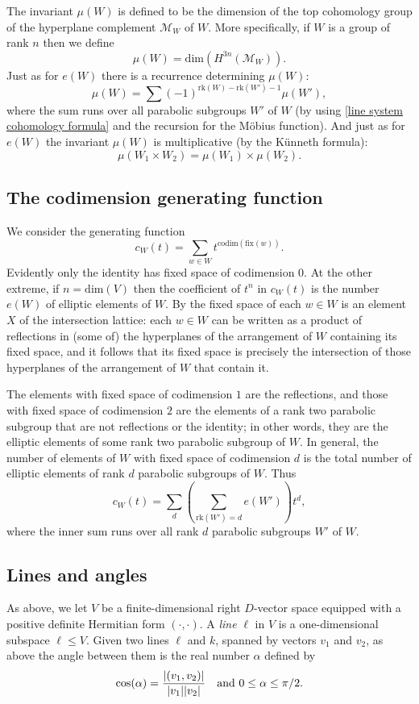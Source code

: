 \documentclass[11pt, reqno]{amsart}
\numberwithin{equation}{section}
\theoremstyle{definition}
\theoremstyle{plain}
\begin{document}
The invariant $\mu(W)$ is defined to be the dimension of the top cohomology group of the hyperplane complement $\mathcal{M}_W$ of $W$. More specifically, if $W$ is a group of rank $n$ then we define
$$\mu(W)=\mathrm{dim}(H^{3n}(\mathcal{M}_W)).$$ Just as for $e(W)$ there is a recurrence determining $\mu(W)$:
$$\mu(W)=\sum (-1)^{\mathrm{rk}(W)-\mathrm{rk}(W')-1} \mu(W'),$$ where the sum runs over all parabolic subgroups $W'$ of $W$ (by using \eqref{line system cohomology formula} and the recursion for the M\"obius function). And just as for $e(W)$ the invariant $\mu(W)$ is multiplicative (by the K\"unneth formula):
$$\mu(W_1 \times W_2)=\mu(W_1) \times \mu(W_2).$$

\subsection{The codimension generating function}

We consider the generating function $$c_W(t)=\sum_{w \in W} t^{\mathrm{codim}(\mathrm{fix}(w))}.$$ Evidently only the identity has fixed space of codimension $0$. At the other extreme, if $n=\mathrm{dim}(V)$ then the coefficient of $t^n$ in $c_W(t)$ is the number $e(W)$ of elliptic elements of $W$. By \cite{BST} the fixed space of each $w \in W$ is an element $X$ of the intersection lattice: each $w \in W$ can be written as a product of reflections in (some of) the hyperplanes of the arrangement of $W$ containing its fixed space, and it follows that its fixed space is precisely the intersection of those hyperplanes of the arrangement of $W$ that contain it. 

The elements with fixed space of codimension $1$ are the reflections, and those with fixed space of codimension $2$ are the elements of a rank two parabolic subgroup that are not reflections or the identity; in other words, they are the elliptic elements of some rank two parabolic subgroup of $W$. In general, the number of elements of $W$ with fixed space of codimension $d$ is the total number of elliptic elements of rank $d$ parabolic subgroups of $W$. Thus
\begin{equation} \label{c e formula}
c_W(t)=\sum_d \left(\sum_{\mathrm{rk}(W')=d} e(W') \right)t^d,
\end{equation} where the inner sum runs over all rank $d$ parabolic subgroups $W'$ of $W$.

\subsection{Lines and angles} As above, we let $V$ be a finite-dimensional right $D$-vector space equipped with a positive definite Hermitian form $(\cdot,\cdot)$. A \emph{line} $\ell$ in $V$ is a one-dimensional subspace $\ell \leq V$. Given two lines $\ell$ and $k$, spanned by vectors $v_1$ and $v_2$, as above the angle between them is the real number $\alpha$ defined by
$$\cos(\alpha)=\frac{|(v_1,v_2)|}{|v_1| |v_2|} \quad \hbox{and $0 \leq \alpha \leq \pi/2$.}$$ 
\end{document}
